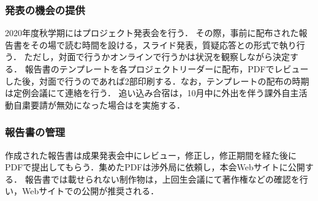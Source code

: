 \subsubsection* {発表の機会の提供}

2020年度秋学期にはプロジェクト発表会を行う．
その際，事前に配布された報告書をその場で読む時間を設ける，スライド発表，質疑応答との形式で執り行う．
ただし，対面で行うかオンラインで行うかは状況を観察しながら決定する．
報告書のテンプレートを各プロジェクトリーダーに配布，PDFでレビューした後，対面で行うのであれば2部印刷する．なお，テンプレートの配布の時期は定例会議にて連絡を行う．
追い込み合宿は，10月中に外出を伴う課外自主活動自粛要請が無効になった場合はを実施する．

\subsubsection* {報告書の管理}

作成された報告書は成果発表会中にレビュー，修正し，修正期間を経た後にPDFで提出してもらう．集めたPDFは渉外局に依頼し，本会Webサイトに公開する．
報告書では載せられない制作物は，上回生会議にて著作権などの確認を行い，Webサイトでの公開が推奨される．
